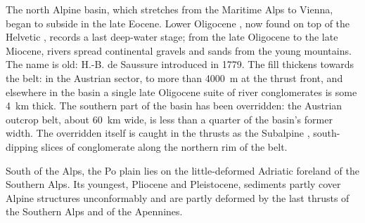 The north Alpine  basin, which stretches from the Maritime Alps to Vienna, began to
subside in the late Eocene. Lower Oligocene , now found on top of the Helvetic
, records a last deep-water stage; from the late Oligocene to the late Miocene, rivers
spread continental gravels and sands from the young mountains. The name is old: H.-B. de Saussure
introduced \emph{} in 1779. The fill thickens towards the belt: in the
Austrian sector, to more than \qty{4000}{m} at the thrust front, and elsewhere in the basin
a single late Oligocene suite of river conglomerates is some \qty{4}{km} thick. The southern part of
the basin has been overridden: the Austrian outcrop belt, about \qty{60}{km} wide, is less
than a quarter of the basin's former width. The overridden  itself is caught in
the thrusts as the Subalpine , south-dipping slices of conglomerate along the
northern rim of the belt.

South of the Alps, the Po plain lies on the little-deformed Adriatic foreland of the
Southern Alps. Its youngest, Pliocene and Pleistocene, sediments partly cover Alpine
structures unconformably and are partly deformed by the last thrusts of the Southern Alps
and of the Apennines.


